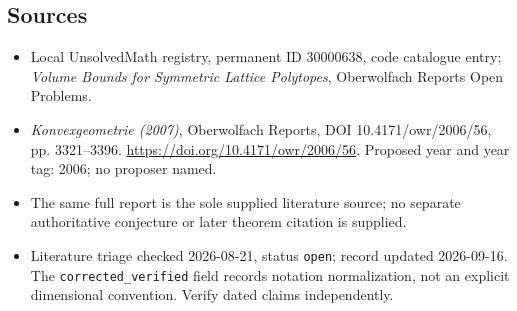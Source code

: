 \documentclass[11pt]{article}
\begin{document}
\subsection{Sources}
\begin{itemize}\item Local UnsolvedMath registry, permanent ID 30000638, code catalogue entry; \emph{Volume Bounds for Symmetric Lattice Polytopes}, Oberwolfach Reports Open Problems.\item \emph{Konvexgeometrie (2007)}, Oberwolfach Reports, DOI 10.4171/owr/2006/56, pp. 3321--3396. \url{https://doi.org/10.4171/owr/2006/56}. Proposed year and year tag: 2006; no proposer named.\item The same full report is the sole supplied literature source; no separate authoritative conjecture or later theorem citation is supplied.\item Literature triage checked 2026-08-21, status \texttt{open}; record updated 2026-09-16. The \texttt{corrected\_verified} field records notation normalization, not an explicit dimensional convention. Verify dated claims independently.\end{itemize}
\end{document}
